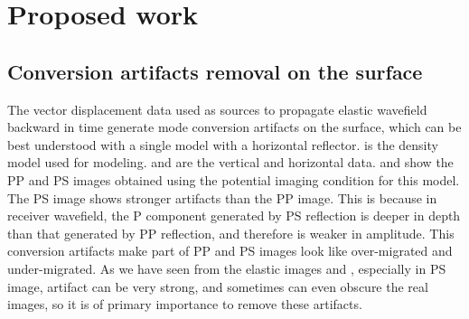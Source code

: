 \section{Proposed work}

\subsection{Conversion artifacts removal on the surface}
The vector displacement data used as sources to propagate elastic wavefield backward in time generate mode conversion artifacts on the surface, which can be best understood with a single model with a horizontal reflector.
 is the density model used for modeling.  and  are the vertical and horizontal data.
 and  show the PP and PS images obtained using the potential imaging condition for this model. The PS image shows stronger artifacts than the PP image. This is because in receiver wavefield, the P component generated by PS reflection is deeper in depth than that generated by PP reflection, and therefore is weaker in amplitude.
This conversion artifacts make part of PP and PS images look like over-migrated and under-migrated. 
As we have seen from the elastic images  and , especially in PS image, artifact can be very strong, and sometimes can even obscure the real images, so it is of primary importance to remove these artifacts.

